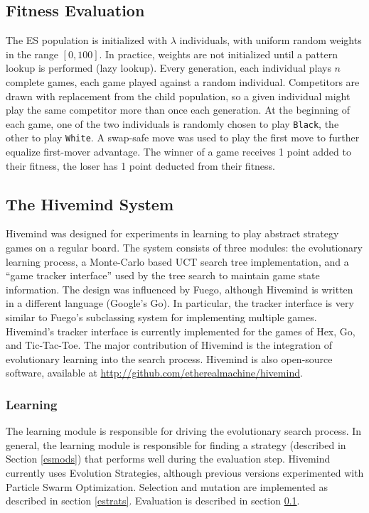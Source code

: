 \documentclass[11pt]{report}
\newcommand{\black}{\texttt{Black}}
\newcommand{\white}{\texttt{White}}
\begin{document}
\subsection{Fitness Evaluation}\label{fitness}
The ES population is initialized with $\lambda$ individuals, with uniform random weights in the range $[0, 100]$. In practice, weights are not initialized until a pattern lookup is performed (lazy lookup). Every generation, each individual plays $n$ complete games, each game played against a random individual. Competitors are drawn with replacement from the child population, so a given individual might play the same competitor more than once each generation. At the beginning of each game, one of the two individuals is randomly chosen to play \black, the other to play \white. A swap-safe move was used to play the first move to further equalize first-mover advantage. The winner of a game receives 1 point added to their fitness, the loser has 1 point deducted from their fitness.

\subsection{The Hivemind System}
Hivemind was designed for experiments in learning to play abstract strategy games on a regular board. The system consists of three modules: the evolutionary learning process, a Monte-Carlo based UCT search tree implementation, and a ``game tracker interface'' used by the tree search to maintain game state information. The design was influenced by Fuego, although Hivemind is written in a different language (Google's Go\cite{golang}). In particular, the tracker interface is very similar to Fuego's subclassing system for implementing multiple games\cite{Fuego}. Hivemind's tracker interface is currently implemented for the games of Hex, Go, and Tic-Tac-Toe. The major contribution of Hivemind is the integration of evolutionary learning into the search process. Hivemind is also open-source software, available at \url{http://github.com/etherealmachine/hivemind}.

\subsubsection{Learning}\label{learning}
The learning module is responsible for driving the evolutionary search process. In general, the learning module is responsible for finding a strategy (described in Section \ref{esmods}) that performs well during the evaluation step. Hivemind currently uses Evolution Strategies, although previous versions experimented with Particle Swarm Optimization. Selection and mutation are implemented as described in section \ref{estrats}. Evaluation is described in section \ref{fitness}. 
\end{document}
